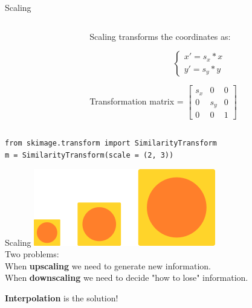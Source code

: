 \documentclass[9pt, aspectratio=169]{beamer}
\begin{document}
\begin{frame}
    {Scaling}

    \begin{columns}
        \begin{column}{0.4\textwidth}
        \end{column}
        \begin{column}{0.6\textwidth}
            Scaling transforms the coordinates as:

            $$\begin{cases}x' = s_x * x\\y' = s_y * y\end{cases}$$

            Transformation matrix = $\begin{bmatrix}s_x&0&0\\0&s_y&0\\0&0&1\end{bmatrix}$
        \end{column}
    \end{columns}
    \pause
    \begin{codebox}
        \texttt{from skimage.transform import SimilarityTransform\\
            m = SimilarityTransform(scale = (2, 3))
        }
    \end{codebox}
\end{frame}
\begin{frame}
    {Scaling}
    \centering
    \includegraphics[width=.3\textwidth]{scaling.png}\\
    Two problems:\\
    When \textbf{upscaling} we need to generate new information.
    \\
    When \textbf{downscaling} we need to decide "how to lose" information.

    \textbf{Interpolation} is the solution!
\end{frame}
\end{document}
